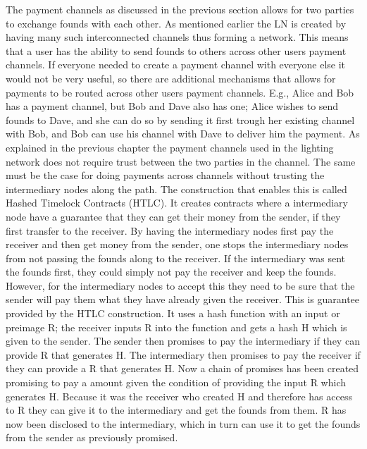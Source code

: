 The payment channels as discussed in the previous section allows for two parties to exchange founds with each other.
As mentioned earlier the LN is created by having many such interconnected channels thus forming a network. This means that a user has the ability to send founds to others across other users payment channels. If everyone needed to create a payment channel with everyone else it would not be very useful, so there are additional mechanisms that allows for payments to be routed across other users payment channels. E.g., Alice and Bob has a payment channel, but Bob and Dave also has one; Alice wishes to send founds to Dave, and she can do so by sending it first trough her existing channel with Bob, and Bob can use his channel with Dave to deliver him the payment.
As explained in the previous chapter the payment channels used in the lighting network does not require trust between the two parties in the channel. The same must be the case for doing payments across channels without trusting the intermediary nodes along the path. The construction that enables this is called Hashed Timelock Contracts (HTLC).
It creates contracts where a intermediary node have a guarantee that they can get their money from the sender, if they first transfer to the receiver. By having the intermediary nodes first pay the receiver and then get money from the sender, one stops the intermediary nodes from not passing the founds along to the receiver. If the intermediary was sent the founds first, they could simply not pay the receiver and keep the founds. However, for the intermediary nodes to accept this they need to be sure that the sender will pay them what they have already given the receiver. This is guarantee provided by the HTLC construction.
It uses a hash function with an input or preimage R; the receiver inputs R into the function and gets a hash H which is given to the sender. The sender then promises to pay the intermediary if they can provide R that generates H. The intermediary then promises to pay the receiver if they can provide a R that generates H. Now a chain of promises has been created promising to pay a amount given the condition of providing the input R which generates H. Because it was the receiver who created H and therefore has access to R they can give it to the intermediary and get the founds from them. R has now been disclosed to the intermediary, which in turn can use it to get the founds from the sender as previously promised. 
\\

